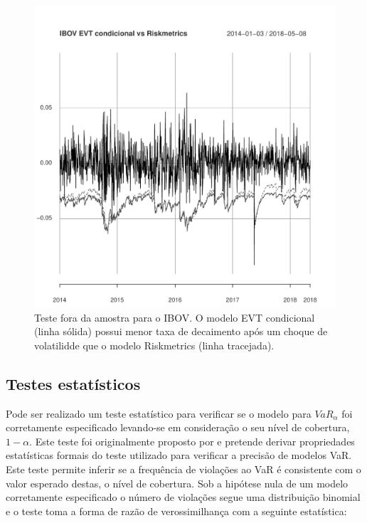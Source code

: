 \documentclass[1p]{elsarticle}
\theoremstyle{definition}
\begin{document}


\begin{figure}[H]
	\centering
	\includegraphics[width=1\linewidth]{figs/artigo-ibovevt}
	\caption{Teste fora da amostra para o IBOV. O modelo EVT condicional (linha sólida) possui menor taxa de decaimento após um choque de volatilidde que o modelo Riskmetrics (linha tracejada).}
	\label{fig:artigo-ibovevt}
\end{figure}

\subsection{Testes estatísticos}
\label{sec:testes}

Pode ser realizado um teste estatístico para verificar se o modelo para $VaR_\alpha$ foi corretamente especificado levando-se em consideração o seu nível de cobertura, $1-\alpha$. Este teste foi originalmente proposto por  \cite{Kupiec1995} e pretende derivar propriedades estatísticas formais do teste utilizado para verificar a precisão de modelos VaR. Este teste permite inferir se a frequência de violações ao VaR é consistente com o valor esperado destas, o nível de cobertura. Sob a hipótese nula de um modelo corretamente especificado o número de violações segue uma distribuição binomial e o teste toma a forma de razão de verossimilhança com a seguinte estatística:
\end{document}
